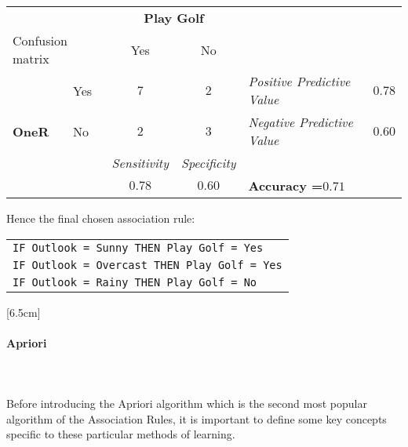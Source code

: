 	\begin{table}[H]
		\centering
		\begin{tabular}{|l|l|c|c|l|l|}
		\hline
		\multicolumn{2}{|l|}{\cellcolor[HTML]{FFFFFF}} & \multicolumn{2}{c|}{\cellcolor[HTML]{C0C0C0}\textbf{Play Golf}} & \multicolumn{2}{l|}{} \\ \cline{3-4}
		\multicolumn{2}{|l|}{\multirow{-2}{*}{\cellcolor[HTML]{FFFFFF}Confusion matrix}} & \cellcolor[HTML]{C0C0C0}Yes & \cellcolor[HTML]{C0C0C0}No & \multicolumn{2}{l|}{\multirow{-2}{*}{}} \\ \hline
		\cellcolor[HTML]{C0C0C0} & \cellcolor[HTML]{C0C0C0}Yes & $7$ & $2$ & \cellcolor[HTML]{FFFFC7}\textit{Positive Predictive Value} & \cellcolor[HTML]{FFFFC7}$0.78$ \\ \cline{2-6} 
		\multirow{-2}{*}{\cellcolor[HTML]{C0C0C0}\textbf{OneR}} & \cellcolor[HTML]{C0C0C0}No & $2$ & $3$ & \cellcolor[HTML]{FFFFC7}\textit{Negative Predictive Value} & \cellcolor[HTML]{FFFFC7}$0.60$ \\ \hline
		\multicolumn{2}{|l|}{} & \cellcolor[HTML]{FFFFC7}\textit{Sensitivity} & \cellcolor[HTML]{FFFFC7}\textit{Specificity} & \multicolumn{2}{l|}{} \\ \cline{3-4}
		\multicolumn{2}{|l|}{\multirow{-2}{*}{}} & \cellcolor[HTML]{FFFFC7}$0.78$ & \cellcolor[HTML]{FFFFC7}$0.60$ & \multicolumn{2}{l|}{\multirow{-2}{*}{\textbf{Accuracy =}$0.71$}} \\ \hline
		\end{tabular}
	\end{table}
	Hence the final chosen association rule:
	\begin{table}[H]
		\centering
		\begin{tabular}{l}
		\texttt{IF Outlook = Sunny THEN Play Golf = Yes}\\
		\texttt{IF Outlook = Overcast THEN Play Golf = Yes}\\
		\texttt{IF Outlook = Rainy THEN Play Golf = No}\\
		\end{tabular}
	\end{table}
	[6.5cm]
	
	\paragraph{Apriori}\mbox{}\\\\
	Before introducing the Apriori algorithm  which is the second most popular algorithm of the Association Rules, it is important to define some key concepts specific to these particular methods of learning.
	
